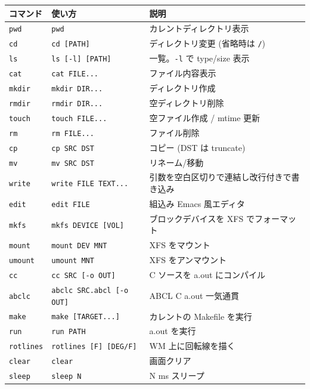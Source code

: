 \documentclass[a4paper,11pt]{ltjsarticle}
\begin{document}
\begin{center}\footnotesize
\begin{longtable}{@{}l l p{7.2cm}@{}}
\toprule
\textbf{コマンド} & \textbf{使い方} & \textbf{説明}\\
\midrule \endhead
\verb|pwd|   & \verb|pwd|              & カレントディレクトリ表示\\
\verb|cd|    & \verb|cd [PATH]|        & ディレクトリ変更 (省略時は \verb|/|)\\
\verb|ls|    & \verb|ls [-l] [PATH]|   & 一覧。\verb|-l| で type/size 表示\\
\verb|cat|   & \verb|cat FILE...|      & ファイル内容表示\\
\verb|mkdir| & \verb|mkdir DIR...|     & ディレクトリ作成\\
\verb|rmdir| & \verb|rmdir DIR...|     & 空ディレクトリ削除\\
\verb|touch| & \verb|touch FILE...|    & 空ファイル作成 / mtime 更新\\
\verb|rm|    & \verb|rm FILE...|       & ファイル削除\\
\verb|cp|    & \verb|cp SRC DST|       & コピー (DST は truncate)\\
\verb|mv|    & \verb|mv SRC DST|       & リネーム/移動\\
\verb|write| & \verb|write FILE TEXT...| & 引数を空白区切りで連結し改行付きで書き込み\\
\verb|edit|  & \verb|edit FILE|        & 組込み Emacs 風エディタ\\
\verb|mkfs|  & \verb|mkfs DEVICE [VOL]| & ブロックデバイスを XFS でフォーマット\\
\verb|mount| & \verb|mount DEV MNT|    & XFS をマウント\\
\verb|umount|& \verb|umount MNT|       & XFS をアンマウント\\
\verb|cc|    & \verb|cc SRC [-o OUT]|  & C ソースを a.out にコンパイル\\
\verb|abclc| & \verb|abclc SRC.abcl [-o OUT]| & ABCL \textrightarrow{} C \textrightarrow{} a.out 一気通貫\\
\verb|make|  & \verb|make [TARGET...]| & カレントの Makefile を実行\\
\verb|run|   & \verb|run PATH|         & a.out を実行\\
\verb|rotlines| & \verb|rotlines [F] [DEG/F]| & WM 上に回転線を描く\\
\verb|clear| & \verb|clear|            & 画面クリア\\
\verb|sleep| & \verb|sleep N|          & N ms スリープ\\
\bottomrule
\end{longtable}
\end{center}
\end{document}

